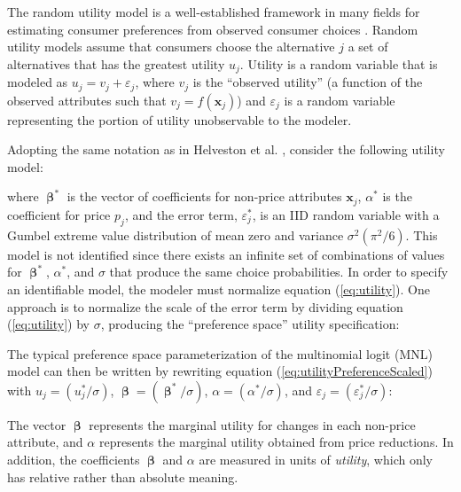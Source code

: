 \documentclass[article]{jss}
\begin{document}
The random utility model is a well-established framework in many fields
for estimating consumer preferences from observed consumer choices
\citep[\citet{Train2009}]{Louviere2000}. Random utility models assume
that consumers choose the alternative \(j\) a set of alternatives that
has the greatest utility \(u_{j}\). Utility is a random variable that is
modeled as \(u_{j} = v_{j} + \varepsilon_{j}\), where \(v_{j}\) is the
``observed utility'' (a function of the observed attributes such that
\(v_{j} = f(\mathrm{\mathbf{x}}_{j})\)) and \(\varepsilon_{j}\) is a
random variable representing the portion of utility unobservable to the
modeler.

Adopting the same notation as in Helveston et al.
\citeyearpar{Helveston2018}, consider the following utility model:



where \(\boldsymbol\upbeta^{*}\) is the vector of coefficients for
non-price attributes \(\mathrm{\mathbf{x}}_{j}\), \(\alpha^{*}\) is the
coefficient for price \(p_{j}\), and the error term,
\(\varepsilon^{*}_{j}\), is an IID random variable with a Gumbel extreme
value distribution of mean zero and variance \(\sigma^2(\pi^2/6)\). This
model is not identified since there exists an infinite set of
combinations of values for \(\boldsymbol\upbeta^{*}\), \(\alpha^{*}\),
and \(\sigma\) that produce the same choice probabilities. In order to
specify an identifiable model, the modeler must normalize equation
(\ref{eq:utility}). One approach is to normalize the scale of the error
term by dividing equation (\ref{eq:utility}) by \(\sigma\), producing
the ``preference space'' utility specification:



The typical preference space parameterization of the multinomial logit
(MNL) model can then be written by rewriting equation
(\ref{eq:utilityPreferenceScaled}) with \(u_j = (u^*_j / \sigma)\),
\(\boldsymbol\upbeta= (\boldsymbol\upbeta^{*} / \sigma)\),
\(\alpha = (\alpha^{*} / \sigma)\), and
\(\varepsilon_{j} = (\varepsilon^{*}_{j} / \sigma)\):



The vector \(\boldsymbol\upbeta\) represents the marginal utility for
changes in each non-price attribute, and \(\alpha\) represents the
marginal utility obtained from price reductions. In addition, the
coefficients \(\boldsymbol\upbeta\) and \(\alpha\) are measured in units
of \emph{utility}, which only has relative rather than absolute meaning.
\end{document}
